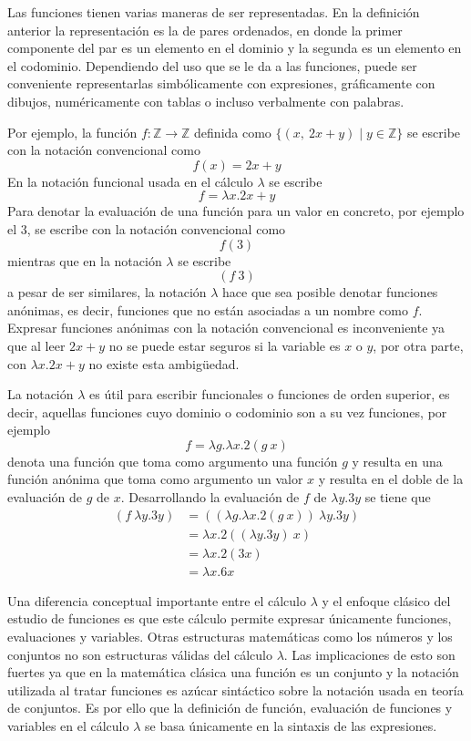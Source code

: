 Las funciones tienen varias maneras de ser representadas. En la definición anterior la representación es la de pares ordenados, en donde la primer componente del par es un elemento en el dominio y la segunda es un elemento en el codominio. Dependiendo del uso que se le da a las funciones, puede ser conveniente representarlas simbólicamente con expresiones, gráficamente con dibujos, numéricamente con tablas o incluso verbalmente con palabras.

Por ejemplo, la función \( f : \mathbb{Z} \to \mathbb{Z} \) definida como \( \{ (x,\ 2x+y) \mid y\in\mathbb{Z} \} \) se escribe con la notación convencional como \[ f(x) = 2x+y \] En la notación funcional usada en el cálculo \( λ \) se escribe \[ f = λx.2x+y \] Para denotar la evaluación de una función para un valor en concreto, por ejemplo el \( 3 \), se escribe con la notación convencional como \[ f(3) \] mientras que en la notación \( λ \) se escribe \[ (f\ 3) \] a pesar de ser similares, la notación \( λ \) hace que sea posible denotar funciones anónimas, es decir, funciones que no están asociadas a un nombre como \( f \). Expresar funciones anónimas con la notación convencional es inconveniente ya que al leer \( 2x+y \) no se puede estar seguros si la variable es \( x \) o \( y \), por otra parte, con \( λx.2x+y \) no existe esta ambigüedad.

La notación \( λ \) es útil para escribir funcionales o funciones de orden superior, es decir, aquellas funciones cuyo dominio o codominio son a su vez funciones, por ejemplo \[ f = λg.λx.2(g\ x) \] denota una función que toma como argumento una función \( g \) y resulta en una función anónima que toma como argumento un valor \( x \) y resulta en el doble de la evaluación de \( g \) de \( x \). Desarrollando la evaluación de \( f \) de \( λy.3y \) se tiene que
\begin{align*}
(f\ λy.3y) 	&= ((λg.λx.2(g\ x))\ λy.3y) \\
			&= λx.2((λy.3y)\ x) \\
            &= λx.2(3x) \\
            &= λx.6x
\end{align*}

Una diferencia conceptual importante entre el cálculo \( λ \) y el enfoque clásico del estudio de funciones es que este cálculo permite expresar únicamente funciones, evaluaciones y variables. Otras estructuras matemáticas como los números y los conjuntos no son estructuras válidas del cálculo \( λ \). Las implicaciones de esto son fuertes ya que en la matemática clásica una función es un conjunto y la notación utilizada al tratar funciones es azúcar sintáctico sobre la notación usada en teoría de conjuntos. Es por ello que la definición de función, evaluación de funciones y variables en el cálculo \( λ \) se basa únicamente en la sintaxis de las expresiones.

